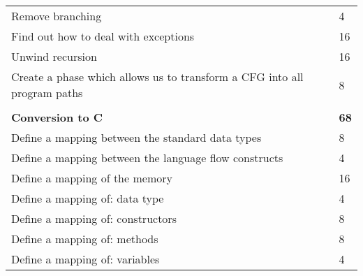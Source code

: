 \documentclass[a4paper]{article}
\begin{document}
\begin{table}[H]
\begin{tabular}{ll}
    Remove branching                                                                                                                                    & 4               \\
    Find out how to deal with exceptions                                                                                                                & 16              \\
    Unwind recursion                                                                                                                                    & 16              \\
    Create a phase which allows us to transform a CFG into all program paths                                                                            & 8               \\
                                                                                                                                                        &                 \\
    \textbf{Conversion to C}                                                                                                                            & \textbf{68}     \\
    Define a mapping between the standard data types                                                                                                    & 8               \\
    Define a mapping between the language flow constructs                                                                                               & 4               \\
    Define a mapping of the memory                                                                                                                      & 16              \\
    Define a mapping of: data type                                                                                                                      & 4               \\
    Define a mapping of: constructors                                                                                                                   & 8               \\
    Define a mapping of: methods                                                                                                                        & 8               \\
    Define a mapping of: variables                                                                                                                      & 4               \\

\end{tabular}
\end{table}
\end{document}
